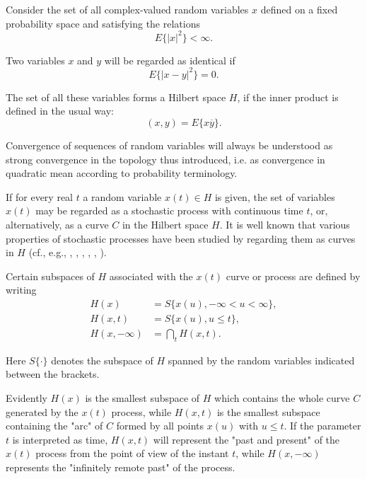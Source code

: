 \documentclass[11pt]{article}
\begin{document}
Consider the set of all complex-valued random variables $x$ defined on a fixed probability space and satisfying the relations
\begin{equation}
E\{|x|^2\} < \infty.
\label{eq:finite_moment}
\end{equation}

Two variables $x$ and $y$ will be regarded as identical if
\begin{equation}
E\{|x - y|^2\} = 0.
\label{eq:identical_vars}
\end{equation}

The set of all these variables forms a Hilbert space $H$, if the inner product is defined in the usual way:
\begin{equation}
(x, y) = E\{x\overline{y}\}.
\label{eq:inner_product}
\end{equation}

Convergence of sequences of random variables will always be understood as strong convergence in the topology thus introduced, i.e. as convergence in quadratic mean according to probability terminology.

If for every real $t$ a random variable $x(t) \in H$ is given, the set of variables $x(t)$ may be regarded as a stochastic process with continuous time $t$, or, alternatively, as a curve $C$ in the Hilbert space $H$. It is well known that various properties of stochastic processes have been studied by regarding them as curves in $H$ (cf., e.g., \cite{kolmogorov1940a}, \cite{kolmogorov1940b}, \cite{neumann1941}, \cite{pinsker1955}, \cite{cramer1951}, \cite{cramer1961}).

Certain subspaces of $H$ associated with the $x(t)$ curve or process are defined by writing
\begin{align}
H(x) &= S\{x(u), -\infty < u < \infty\}, \label{eq:subspace_H_x}\\
H(x, t) &= S\{x(u), u \leq t\}, \label{eq:subspace_H_x_t}\\
H(x, -\infty) &= \bigcap_{t} H(x, t). \label{eq:subspace_H_x_minus_infty}
\end{align}

Here $S\{\cdot\}$ denotes the subspace of $H$ spanned by the random variables indicated between the brackets.

Evidently $H(x)$ is the smallest subspace of $H$ which contains the whole curve $C$ generated by the $x(t)$ process, while $H(x, t)$ is the smallest subspace containing the "arc" of $C$ formed by all points $x(u)$ with $u \leq t$. If the parameter $t$ is interpreted as time, $H(x, t)$ will represent the "past and present" of the $x(t)$ process from the point of view of the instant $t$, while $H(x, -\infty)$ represents the "infinitely remote past" of the process.
\end{document}
